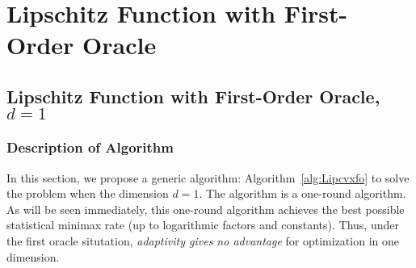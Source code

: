 \newcommand{\logtwo}{\log_2}

\section{Lipschitz Function with First-Order Oracle}
\label{sec:proof-Lip-fo}
\subsection{Lipschitz Function with First-Order Oracle, $d = 1$}
\subsubsection{Description of Algorithm}
In this section, we propose a generic algorithm: Algorithm~\ref{alg:Lipcvxfo}
to solve the problem when the dimension $d = 1$. The algorithm is a one-round 
algorithm. As will be seen immediately, this one-round algorithm achieves the 
best possible statistical minimax rate (up to logarithmic factors and constants). 
Thus, under the first oracle situtation, \emph{adaptivity gives no advantage} 
for optimization in one dimension.
